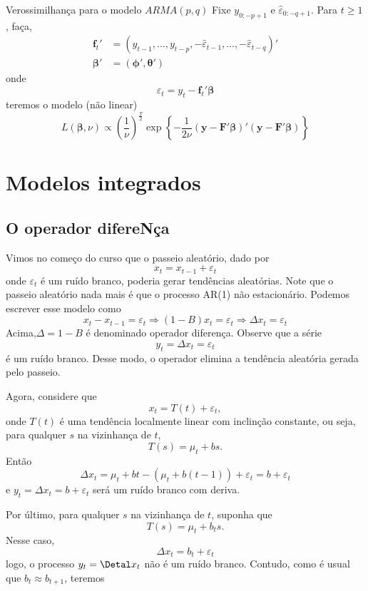 \documentclass[
  letterpaper,
  DIV=11,
  numbers=noendperiod]{scrartcl}
\theoremstyle{plain}
\theoremstyle{plain}
\theoremstyle{definition}
\theoremstyle{definition}
\theoremstyle{remark}
\begin{document}
\begin{frame}{Verossimilhança para o modelo $ARMA(p,q)$}
    Fixe $y_{0:-p+1}$ e $\hat{\varepsilon}_{0:-q+1}$. Para $t\geq 1$, faça,
    \begin{align}
    \bm{f}_t'&= \left(y_{t-1},\ldots,y_{t-p} , -\hat{\varepsilon}_{t-1},\ldots,-\hat{\varepsilon}_{t-q} \right)'\\
    \bm{\beta}'&=\left(\bm{\phi}',\bm{\theta}'\right)
    \end{align}
    onde
    $$\hat{\varepsilon}_t = y_t - \bm{f}_t'\bm{\beta}  $$
    teremos o modelo (não linear)
    $$L(\bm{\beta},\nu)\propto \left(\frac{1}{\nu}\right)^{\frac{T}{2}}\exp\left\{-\frac{1}{2\nu}\left(\bm{y}-\bm{F}'\bm{\beta}\right)'\left(\bm{y}-\bm{F}'\bm{\beta}\right)\right\}$$
\end{frame}

\hypertarget{modelos-integrados}{%
\section{Modelos integrados}\label{modelos-integrados}}

\hypertarget{o-operador-diferenuxe7a}{%
\subsection{O operador difereNça}\label{o-operador-diferenuxe7a}}

Vimos no começo do curso que o passeio aleatório, dado por
\[x_t=x_{t-1}+\varepsilon_t\] onde \(\varepsilon_t\) é um ruído branco,
poderia gerar tendências aleatórias. Note que o passeio aleatório nada
mais é que o processo AR(1) não estacionário. Podemos escrever esse
modelo como
\[x_t-x_{t-1}=\varepsilon_t\Rightarrow(1-B)x_t=\varepsilon_t\Rightarrow\Delta x_t=\varepsilon_t\]
Acima,\(\Delta=1-B\) é denominado operador diferença. Observe que a
série \[y_t=\Delta x_t=\varepsilon_t\] é um ruído branco. Desse modo, o
operador elimina a tendência aleatória gerada pelo passeio.

Agora, considere que \[x_t=T(t)+\varepsilon_t,\] onde \(T(t)\) é uma
tendência localmente linear com inclinção constante, ou seja, para
qualquer \(s\) na vizinhança de \(t\), \[T(s)=\mu_t+b s.\] Então
\[\Delta x_t= \mu_t+bt-(\mu_t+b(t-1))+\varepsilon_t=b+\varepsilon_t\] e
\(y_t=\Delta x_t=b+\varepsilon_t\) será um ruído branco com deriva.

Por último, para qualquer \(s\) na vizinhança de \(t\), suponha que
\[T(s)=\mu_t+b_t s.\] Nesse caso, \[\Delta x_t= b_t+\varepsilon_t\]
logo, o processo \(y_t=\Detal x_t\) não é um ruído branco. Contudo, como
é usual que \(b_t\approx b_{t+1}\), teremos
\end{document}
